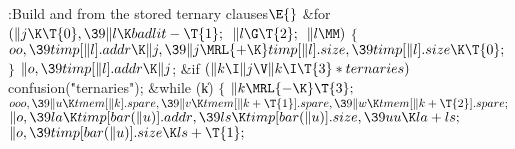 \B{}:Build  and  from the
stored ternary clauses\X${}\E{}$\6
\&{for} ${}(\|j\K\T{0},\39\|l\K\\{badlit}-\T{1};{}$ ${}\|l\G\T{2};{}$ ${}\|l%
\MM){}$\5
${}\{{}$\1\6
${}\\{oo},\39\\{timp}[\|l].\\{addr}\K\|j,\39\|j\MRL{+{\K}}\\{timp}[\|l].%
\\{size},\39\\{timp}[\|l].\\{size}\K\T{0};{}$\6
\4${}\}{}$\2\6
${}\|o,\39\\{timp}[\|l].\\{addr}\K\|j{}$;\6
\&{if} ${}(\|k\I\|j\V\|k\I\T{3}*\\{ternaries}){}$\1\5
\\{confusion}(\.{"ternaries"});\2\6
\&{while} (\|k)\5
${}\{{}$\1\6
${}\|k\MRL{-{\K}}\T{3};{}$\6
${}\\{ooo},\39\|u\K\\{tmem}[\|k].\\{spare},\39\|v\K\\{tmem}[\|k+\T{1}].%
\\{spare},\39\|w\K\\{tmem}[\|k+\T{2}].\\{spare};{}$\6
${}\|o,\39\\{la}\K\\{timp}[\\{bar}(\|u)].\\{addr},\39\\{ls}\K\\{timp}[\\{bar}(%
\|u)].\\{size},\39\\{uu}\K\\{la}+\\{ls};{}$\6
${}\|o,\39\\{timp}[\\{bar}(\|u)].\\{size}\K\\{ls}+\T{1};{}$\6
